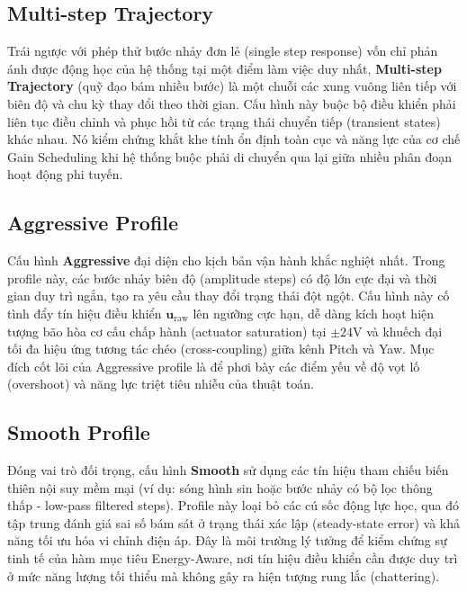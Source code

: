 \documentclass[conference, a4paper]{IEEEtran}
\begin{document}
\subsection{Multi-step Trajectory}
Trái ngược với phép thử bước nhảy đơn lẻ (single step response) vốn chỉ phản ánh được động học của hệ thống tại một điểm làm việc duy nhất, \textbf{Multi-step Trajectory} (quỹ đạo bám nhiều bước) là một chuỗi các xung vuông liên tiếp với biên độ và chu kỳ thay đổi theo thời gian. Cấu hình này buộc bộ điều khiển phải liên tục điều chỉnh và phục hồi từ các trạng thái chuyển tiếp (transient states) khác nhau. Nó kiểm chứng khắt khe tính ổn định toàn cục và năng lực của cơ chế Gain Scheduling khi hệ thống buộc phải di chuyển qua lại giữa nhiều phân đoạn hoạt động phi tuyến.

\subsection{Aggressive Profile}
Cấu hình \textbf{Aggressive} đại diện cho kịch bản vận hành khắc nghiệt nhất. Trong profile này, các bước nhảy biên độ (amplitude steps) có độ lớn cực đại và thời gian duy trì ngắn, tạo ra yêu cầu thay đổi trạng thái đột ngột. Cấu hình này cố tình đẩy tín hiệu điều khiển $\mathbf{u}_{\mathrm{raw}}$ lên ngưỡng cực hạn, dễ dàng kích hoạt hiện tượng bão hòa cơ cấu chấp hành (actuator saturation) tại $\pm 24\mathrm{V}$ và khuếch đại tối đa hiệu ứng tương tác chéo (cross-coupling) giữa kênh Pitch và Yaw. Mục đích cốt lõi của Aggressive profile là để phơi bày các điểm yếu về độ vọt lố (overshoot) và năng lực triệt tiêu nhiễu của thuật toán.

\subsection{Smooth Profile}
Đóng vai trò đối trọng, cấu hình \textbf{Smooth} sử dụng các tín hiệu tham chiếu biến thiên nội suy mềm mại (ví dụ: sóng hình sin hoặc bước nhảy có bộ lọc thông thấp - low-pass filtered steps). Profile này loại bỏ các cú sốc động lực học, qua đó tập trung đánh giá sai số bám sát ở trạng thái xác lập (steady-state error) và khả năng tối ưu hóa vi chỉnh điện áp. Đây là môi trường lý tưởng để kiểm chứng sự tinh tế của hàm mục tiêu Energy-Aware, nơi tín hiệu điều khiển cần được duy trì ở mức năng lượng tối thiểu mà không gây ra hiện tượng rung lắc (chattering).
\end{document}

